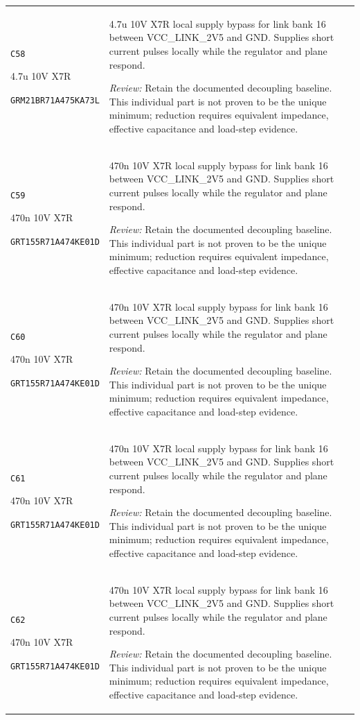 \documentclass[10pt,a4paper]{article}
\begin{document}
\begin{longtable}{@{}P{46mm}P{117mm}@{}}
\nolinkurl{C58}\par 4.7u 10V X7R\par\scriptsize \nolinkurl{GRM21BR71A475KA73L} & 4.7u 10V X7R local supply bypass for link bank 16 between VCC\_LINK\_2V5 and GND. Supplies short current pulses locally while the regulator and plane respond.\par\smallskip\textit{Review:} Retain the documented decoupling baseline. This individual part is not proven to be the unique minimum; reduction requires equivalent impedance, effective capacitance and load-step evidence. \\
\nolinkurl{C59}\par 470n 10V X7R\par\scriptsize \nolinkurl{GRT155R71A474KE01D} & 470n 10V X7R local supply bypass for link bank 16 between VCC\_LINK\_2V5 and GND. Supplies short current pulses locally while the regulator and plane respond.\par\smallskip\textit{Review:} Retain the documented decoupling baseline. This individual part is not proven to be the unique minimum; reduction requires equivalent impedance, effective capacitance and load-step evidence. \\
\nolinkurl{C60}\par 470n 10V X7R\par\scriptsize \nolinkurl{GRT155R71A474KE01D} & 470n 10V X7R local supply bypass for link bank 16 between VCC\_LINK\_2V5 and GND. Supplies short current pulses locally while the regulator and plane respond.\par\smallskip\textit{Review:} Retain the documented decoupling baseline. This individual part is not proven to be the unique minimum; reduction requires equivalent impedance, effective capacitance and load-step evidence. \\
\nolinkurl{C61}\par 470n 10V X7R\par\scriptsize \nolinkurl{GRT155R71A474KE01D} & 470n 10V X7R local supply bypass for link bank 16 between VCC\_LINK\_2V5 and GND. Supplies short current pulses locally while the regulator and plane respond.\par\smallskip\textit{Review:} Retain the documented decoupling baseline. This individual part is not proven to be the unique minimum; reduction requires equivalent impedance, effective capacitance and load-step evidence. \\
\nolinkurl{C62}\par 470n 10V X7R\par\scriptsize \nolinkurl{GRT155R71A474KE01D} & 470n 10V X7R local supply bypass for link bank 16 between VCC\_LINK\_2V5 and GND. Supplies short current pulses locally while the regulator and plane respond.\par\smallskip\textit{Review:} Retain the documented decoupling baseline. This individual part is not proven to be the unique minimum; reduction requires equivalent impedance, effective capacitance and load-step evidence. \\

\end{longtable}
\end{document}
